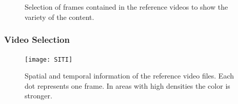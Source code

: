 \begin{frame}
\begin{figure}[hbt!]
\begin{center}
		\\ %
		\\ %
	\end{center}
	\caption{%
		Selection of frames contained in the reference videos to show the variety of the content.
	}%
	\label{fig:OverviewReferenceSequences}
\end{figure}
\end{frame}


\begin{frame}
\frametitle{Video Selection}

\begin{figure}[hbt!]
	\centering
	\texttt{[image: SITI]}
	\caption{Spatial and temporal information of the reference video files. Each dot represents one frame. In areas with high densities the color is stronger.}
	\label{fig:SITI}
\end{figure}


\end{frame}


